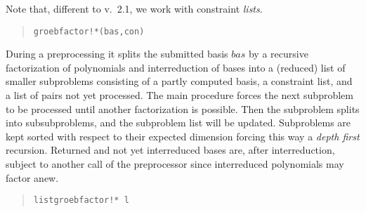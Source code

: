 Note that, different to v.\ 2.1, we work with constraint {\em lists}.
\begin{quote}
\verb|groebfactor!*(bas,con)|

\end{quote}
During a preprocessing it splits the submitted basis $bas$ by a
recursive factorization of polynomials and interreduction of bases
into a (reduced) list of smaller subproblems consisting of a partly
computed \gr basis, a constraint list, and a list of pairs not yet
processed. The main procedure forces the next subproblem to be
processed until another factorization is possible. Then the
subproblem splits into subsubproblems, and the subproblem list will
be updated. Subproblems are kept sorted with respect to their
expected dimension  forcing this way a {\em depth first}
recursion.  Returned and not yet interreduced \gr bases are, after
interreduction, subject to another call of the preprocessor since
interreduced polynomials may factor anew.
\begin{quote}
\verb|listgroebfactor!* l| 

\end{quote}
\medskip

